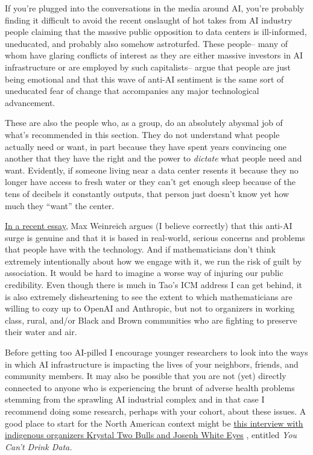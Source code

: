 \documentclass[11pt,reqno]{amsart}
\theoremstyle{plain}
\theoremstyle{definition}
\numberwithin{equation}{section}
\numberwithin{theorem}{section}
\begin{document}
If you’re plugged into the conversations in the media around AI, you’re probably finding it difficult to avoid the recent onslaught of hot takes from AI industry people claiming that the massive public opposition to data centers is ill-informed, uneducated, and probably also somehow astroturfed. These people– many of whom have glaring conflicts of interest as they are either massive investors in AI infrastructure or are employed by such capitalists– argue that people are just being emotional and that this wave of anti-AI sentiment is the same sort of uneducated fear of change that accompanies any major technological advancement. 


These are also the people who, as a group, do an absolutely abysmal job of what's recommended in this section. They do not understand what people actually need or want, in part because they have spent years convincing one another that they have the right and the power to \textit{dictate} what people need and want. Evidently, if someone living near a data center resents it because they no longer have access to fresh water or they can’t get enough sleep because of the tens of decibels it constantly outputs, that person just doesn’t know yet how much they ``want'' the center. 

\href{https://arxiv.org/abs/2608.02859}{In a recent essay}, Max Weinreich argues (I believe correctly) that this anti-AI surge is genuine and that it is based in real-world, serious concerns and problems that people have with the technology. And if mathematicians don’t think extremely intentionally about how we engage with it, we run the risk of guilt by association. It would be hard to imagine a worse way of injuring our public credibility. Even though there is much in Tao’s ICM address I can get behind, it is also extremely disheartening to see the extent to which mathematicians are willing to cozy up to OpenAI and Anthropic, but not to organizers in working class, rural, and/or Black and Brown communities who are fighting to preserve their water and air. 

Before getting too AI-pilled I encourage younger researchers to look into the ways in which AI infrastructure is impacting the lives of your neighbors, friends, and community members. It may also be possible that you are not (yet) directly connected to anyone who is experiencing the brunt of adverse health problems stemming from the sprawling AI industrial complex and in that case I recommend doing some research, perhaps with your cohort, about these issues. A good place to start for the North American context might be \href{https://truthout.org/audio/you-cant-drink-data-native-communities-are-resisting-the-ai-death-cycle/}{this interview with indigenous organizers Krystal Two Bulls and Joseph White Eyes} \cite{Interview}, entitled \textit{You Can’t Drink Data. }
\end{document}
